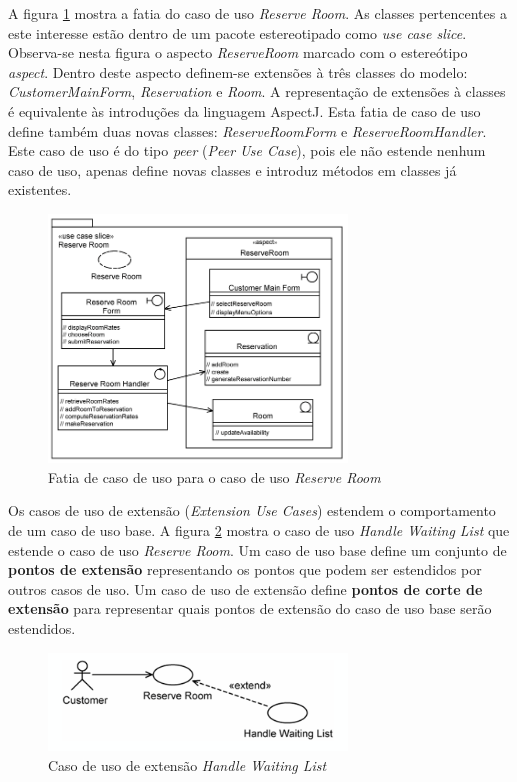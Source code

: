 A figura \ref{fig:jacobson_reserve_room_slice} mostra a fatia do caso de uso \textit{Reserve Room}. As classes pertencentes a este interesse
estão dentro de um pacote estereotipado como \textit{use case slice}. Observa-se nesta figura o aspecto \textit{ReserveRoom} marcado com o estereótipo
\textit{aspect}. Dentro deste aspecto definem-se extensões à três classes do modelo: \textit{CustomerMainForm}, \textit{Reservation} e \textit{Room}.
A representação de extensões à classes é equivalente às introduções da linguagem AspectJ. Esta fatia de caso de uso define também
duas novas classes: \textit{ReserveRoomForm} e \textit{ReserveRoomHandler}. Este caso de uso é do tipo \textit{peer} (\textit{Peer Use Case}), pois
ele não estende nenhum caso de uso, apenas define novas classes e introduz métodos em classes já existentes.

\begin{figure}
	\centering
	\includegraphics[width=300px]{img/jacobson_reserve_room_slice.png}
	\caption{Fatia de caso de uso para o
	caso de uso \textit{Reserve Room}}\label{fig:jacobson_reserve_room_slice}
\end{figure}

Os casos de uso de extensão (\textit{Extension Use Cases}) estendem o comportamento de um caso de uso base. A figura
\ref{fig:jacobson_use_case_extension} mostra o caso de uso \textit{Handle Waiting List} que estende o caso de uso \textit{Reserve Room}. Um caso de
uso base define um conjunto de \textbf{pontos de extensão} representando os pontos que podem ser estendidos por outros casos de uso. Um caso de uso de
extensão define \textbf{pontos de corte de extensão} para representar quais pontos de extensão do caso de uso base serão estendidos. 

\begin{figure}
	\centering
	\includegraphics[width=300px]{img/jacobson_use_case_extension.png}
	\caption{Caso de uso de extensão
	\textit{Handle Waiting List}}\label{fig:jacobson_use_case_extension}
\end{figure}

